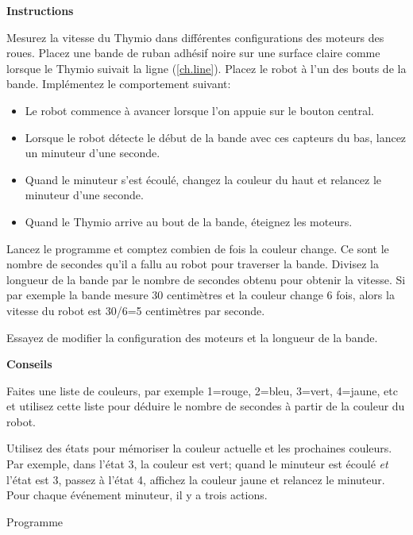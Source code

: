 \label{ch.speed}

\textbf{Instructions}

Mesurez la vitesse du Thymio dans différentes configurations des moteurs des roues.
Placez une bande de ruban adhésif noire sur une surface claire comme lorsque le Thymio
suivait la ligne (\cref{ch.line}).
Placez le robot à l'un des bouts de la bande. Implémentez le comportement suivant:

\begin{itemize}

\item Le robot commence à avancer lorsque l'on appuie sur le bouton central.

\item Lorsque le robot détecte le début de la bande avec ces capteurs du bas,
    lancez un minuteur d'une seconde.

\item Quand le minuteur s'est écoulé, changez la couleur du haut et relancez le minuteur d'une seconde.

\item Quand le Thymio arrive au bout de la bande, éteignez les moteurs.

    \end{itemize}

Lancez le programme et comptez combien de fois la couleur change.
Ce sont le nombre de secondes qu'il a fallu au robot pour traverser la bande.
Divisez la longueur de la bande par le nombre de secondes obtenu pour obtenir la vitesse.
Si par exemple la bande mesure 30 centimètres et la couleur change 6 fois, alors la vitesse
du robot est 30/6=5 centimètres par seconde.

Essayez de modifier la configuration des moteurs et la longueur de la bande.

\textbf{Conseils}

Faites une liste de couleurs, par exemple 1=rouge, 2=bleu, 3=vert, 4=jaune, etc
et utilisez cette liste pour déduire le nombre de secondes à partir de la couleur du robot.

Utilisez des états pour mémoriser la couleur actuelle et les prochaines couleurs.
Par exemple, dans l'état 3, la couleur est vert; quand le minuteur est écoulé \emph{et}
l'état est 3, passez à l'état 4, affichez la couleur jaune et relancez le minuteur.
Pour chaque événement minuteur, il y a trois actions.

\bigskip

{\raggedleft \hfill Programme }
